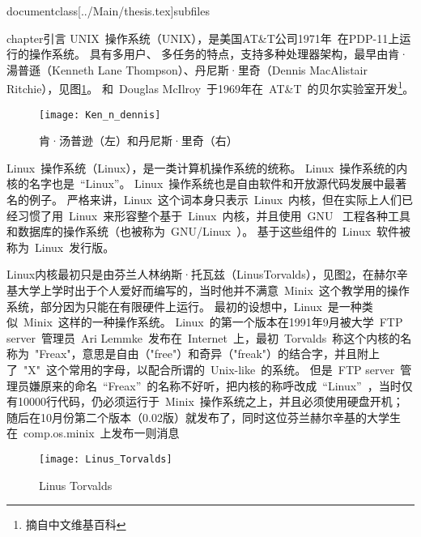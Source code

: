 documentclass[../Main/thesis.tex]{subfiles}

chapter{引言}
\label{cha:intro}
UNIX~操作系统（UNIX），是美国AT\&T公司1971年~在PDP-11上运行的操作系统。
具有多用户、 多任务的特点，支持多种处理器架构，最早由肯·湯普遜（Kenneth Lane Thompson）、丹尼斯·里奇（Dennis MacAlistair Ritchie），见图\ref{fig:ken}。
和~Douglas McIlroy~于1969年在~AT\&T~的贝尔实验室开发\footnote{摘自中文维基百科}。

\begin{figure}[htbp]
  \centering
  \texttt{[image: Ken\_n\_dennis]}
  \caption{肯·汤普逊（左）和丹尼斯·里奇（右）}
  \label{fig:ken}
\end{figure}
Linux~操作系统（Linux），是一类计算机操作系统的统称。
Linux~操作系统的内核的名字也是~“Linux”。
Linux~操作系统也是自由软件和开放源代码发展中最著名的例子。
严格来讲，Linux~这个词本身只表示~Linux~内核，但在实际上人们已经习惯了用~Linux~来形容整个基于~Linux~内核，并且使用~GNU~ 工程各种工具和数据库的操作系统（也被称为~GNU/Linux~）。
基于这些组件的~Linux~软件被称为~Linux~发行版。

Linux内核最初只是由芬兰人林纳斯·托瓦兹（LinusTorvalds），见图\ref{fig:linus}，在赫尔辛基大学上学时出于个人爱好而编写的，当时他并不满意~Minix~这个教学用的操作系统，部分因为只能在有限硬件上运行。
最初的设想中，Linux~是一种类似~Minix~这样的一种操作系统。
Linux~的第一个版本在1991年9月被大学~FTP server~管理员~Ari Lemmke~发布在~Internet~上，最初~Torvalds~称这个内核的名称为~"Freax"，意思是自由（"free"）和奇异（"freak"）的结合字，并且附上了~"X"~这个常用的字母，以配合所谓的~Unix-like~的系统。
但是~FTP server~管理员嫌原来的命名~“Freax”~的名称不好听，把内核的称呼改成~“Linux”~，当时仅有10000行代码，仍必须运行于~Minix~操作系统之上，并且必须使用硬盘开机；
随后在10月份第二个版本（0.02版）就发布了，同时这位芬兰赫尔辛基的大学生在~comp.os.minix~上发布一则消息

\begin{center}
\end{center}
\begin{figure}[htbp]
  \centering
  \texttt{[image: Linus\_Torvalds]}
  \caption{Linus Torvalds}
  \label{fig:linus}
\end{figure}

